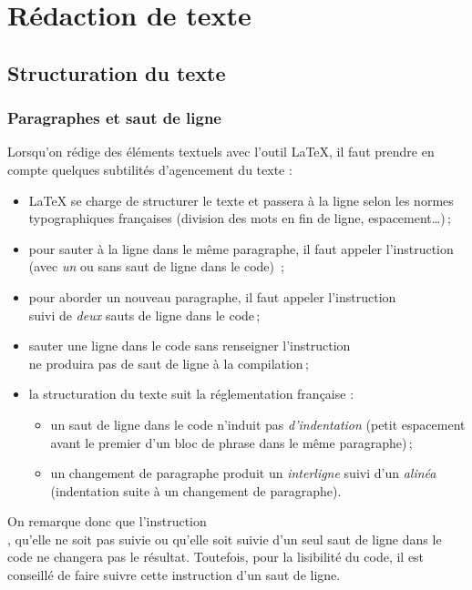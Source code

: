 \documentclass[a4paper, 11pt, twoside, fleqn]{memoir}
\begin{document}

	\chapter{Rédaction de texte}
	\ChapFrame %
	
	\section{Structuration du texte}
	
	\subsection{Paragraphes et saut de ligne\label{subsec:paragraphes_saut_ligne}}
	
Lorsqu'on rédige des éléments textuels avec l'outil \LaTeX{}, il faut prendre en compte quelques subtilités d'agencement du texte :

\begin{itemize}
\item \LaTeX{} se charge de structurer le texte et passera à la ligne selon les normes typographiques françaises (division des mots en fin de ligne, espacement\ldots)\,;
\item pour sauter à la ligne dans le même paragraphe, il faut appeler l'instruction \texttt{\\} (avec \emph{un} ou sans saut de ligne dans le code) \,;
\item pour aborder un nouveau paragraphe, il faut appeler l'instruction \texttt{\\} suivi de \emph{deux} sauts de ligne dans le code\,;
\item sauter une ligne dans le code sans renseigner l'instruction \texttt{\\} ne produira pas de saut de ligne à la compilation\,;
\item la structuration du texte suit la réglementation française : 
\begin{itemize}
\item un saut de ligne dans le code n'induit pas \emph{d'indentation} (petit espacement avant le premier d'un bloc de phrase dans le même paragraphe)\,;
\item un changement de paragraphe produit un \emph{interligne} suivi d'un \emph{alinéa} (indentation suite à un changement de paragraphe).\\
\end{itemize}
\end{itemize}
On remarque donc que l'instruction \texttt{\\} , qu'elle ne soit pas suivie ou qu'elle soit suivie d'un seul saut de ligne dans le code ne changera pas le résultat. Toutefois, pour la lisibilité du code, il est conseillé de faire suivre cette instruction d'un saut de ligne.
\end{document}
